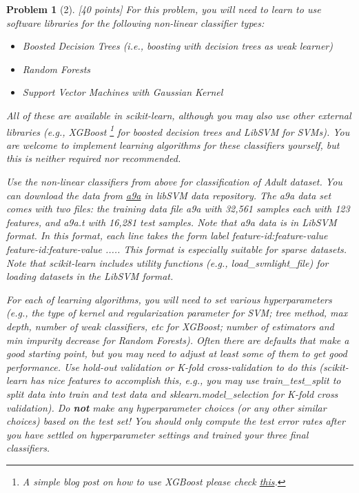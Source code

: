 \documentclass[11pt]{article}
\theoremstyle{quest}
\newtheorem*{problem}{Problem}
\begin{document}
\begin{problem}[2] [40 points]
For this problem, you will need to learn to use software libraries for the following non-linear classifier types:
\begin{itemize}
  \item Boosted Decision Trees (i.e., boosting with decision trees as weak learner)
  \item Random Forests
  \item Support Vector Machines with Gaussian Kernel
\end{itemize}

All of these are available in \textsf{scikit-learn}, although you may also use other external libraries (e.g., \textsf{XGBoost} \footnote{A simple blog post on how to use XGBoost please check \href{https://machinelearningmastery.com/develop-first-xgboost-model-python-scikit-learn/}{this}.} for boosted decision trees and \textsf{LibSVM} for SVMs). You are welcome to implement learning algorithms for these classifiers yourself, but this is neither required nor recommended.

Use the non-linear classifiers from above for classification of Adult dataset. You can download the data from \href{https://www.csie.ntu.edu.tw/~cjlin/libsvmtools/datasets/binary.html}{a9a} in libSVM data repository. The a9a data set comes with two files: the training data file \textsf{a9a} with 32,561 samples each with 123 features, and \textsf{a9a.t} with 16,281 test samples. Note that a9a data is in LibSVM format. In this format, each line takes the form \textsf{\textlangle{}label\textrangle{} \textlangle{}feature-id\textrangle{}:\textlangle{}feature-value\textrangle{} \textlangle{}feature-id\textrangle{}:\textlangle{}feature-value\textrangle{}} ..... This format is especially suitable for sparse datasets. Note that \textsf{scikit-learn} includes utility functions (e.g., \textsf{load\_svmlight\_file}) for loading datasets in the LibSVM format.

For each of learning algorithms, you will need to set various hyperparameters (e.g., the type of kernel and regularization parameter for SVM; tree method, max depth, number of weak classifiers, etc for XGBoost; number of estimators and min impurity decrease for Random Forests). Often there are defaults that make a good starting point, but you may need to adjust at least some of them to get good performance. Use hold-out validation or K-fold cross-validation to do this (\textsf{scikit-learn} has nice features to accomplish this, e.g., you may use \textsf{train\_test\_split} to split data into train and test data and \textsf{sklearn.model\_selection} for K-fold cross validation). Do \textbf{not} make any hyperparameter choices (or any other similar choices) based on the test set! You should only compute the test error rates after you have settled on hyperparameter settings and trained your three final classifiers.


\end{problem}
\end{document}
